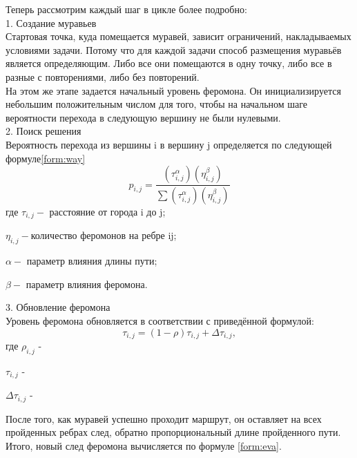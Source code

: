 \documentclass[12pt]{report}
\begin{document}
Теперь рассмотрим каждый шаг в цикле более подробно:\\

1. Создание муравьев\\
   Стартовая точка, куда помещается муравей, зависит ограничений,   накладываемых условиями задачи. Потому что для каждой задачи   способ размещения муравьёв является определяющим. Либо все они помещаются в одну точку, либо все в разные с повторениями, либо без повторений. \\
  На этом же этапе задается начальный уровень феромона. Он    инициализируется небольшим положительным числом для того, чтобы на начальном шаге вероятности перехода в следующую вершину не были нулевыми. \\
  
2. Поиск решения  \\
 Вероятность перехода из вершины i в вершину j определяется по следующей формуле\ref{form:way}\\   
\begin{equation}\label{form:way} 
 p_{i,j}={\frac {(\tau _{i,j}^{\alpha })(\eta _{i,j}^{\beta })}{\sum (\tau _{i,j}^{\alpha })(\eta _{i,j}^{\beta })}}
 \end{equation}
    где \quad$ \tau _{i,j} - $ расстояние от города i до j;
    
         $\eta _{i,j} - $количество феромонов на ребре ij;
         
          $\alpha - $ параметр влияния длины пути;
          
          $\beta - $ параметр влияния феромона.


3. Обновление феромона \\
  Уровень феромона обновляется в соответствии с приведённой формулой:\\
  \begin{equation}\label{form:eva} 
    \tau _{i,j}=(1-\rho )\tau _{i,j}+\Delta \tau _{i,j},
  \end{equation}
  где \quad$ \rho _{i,j}$ -  

    $\tau _{i,j}$ -  
    
    $\Delta \tau _{i,j}$ - 

После того, как муравей успешно проходит маршрут, он оставляет на всех пройденных ребрах след, обратно пропорциональный длине пройденного пути. Итого, новый след феромона вычисляется по формуле \ref{form:eva}.
\end{document}

